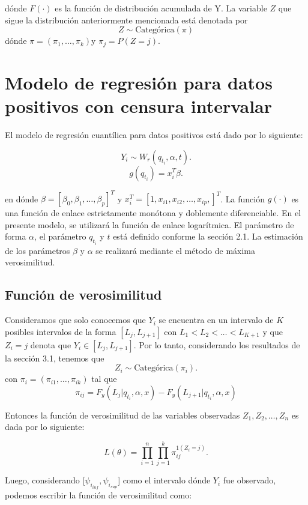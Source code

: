 \noindent dónde $F(\cdot)$ es la función de distribución acumulada de Y. La variable $Z$ que sigue la distribución anteriormente mencionada está denotada por 
$$Z \sim \text{Categórica}(\pi)$$
\noindent dónde $\pi=\left( \pi_{1},\dots,\pi_{k}\right)$y $\pi_{j}=P(Z=j)$.

\section{Modelo de regresión para datos positivos con censura intervalar}

El modelo de regresión cuantílica para datos positivos está dado por lo siguiente:

\[Y_{i} \sim W_{r}\left( q_{t_{i}},\alpha,t \right).\]
\[g\left( q_{t_{i}} \right) = x_{i}^{T}\beta.\]

\noindent en dónde $\beta=\left[ \beta_0,\beta_{1},\dots,\beta_{p} \right]^{T}$ y $x_{i}^{T} =\left[ 1,x_{i1},x_{i2},\dots,x_{ip}, \right]^{T}$. La función $g(\cdot)$ es una función de enlace estrictamente monótona y doblemente diferenciable. En el presente modelo, se utilizará la función de enlace logarítmica. El parámetro de forma $\alpha$, el parámetro $q_{t_{i}}$ y $t$ está definido conforme la sección 2.1. La estimación de los parámetros $\beta$ y $\alpha$ se realizará mediante el método de máxima verosimilitud.

\subsection{Función de verosimilitud}
Consideramos que solo conocemos que $Y_{i}$ se encuentra en un intervalo de $K$ posibles intervalos de la forma $[L_{j},L_{j+1}]$ con $L_1 < L_2 < \dots < L_{K+1}$ y que $Z_{i}=j$ denota que $Y_{i} \in [L_{j},L_{j+1}]$. Por lo tanto, considerando los resultados de la sección 3.1, tenemos que
\[Z_{i} \sim \text{Categórica}(\pi_{i}).\]
\noindent con $\pi_{i}=\left( \pi_{i1},\dots, \pi_{ik} \right)$ tal que
\begin{equation}
\pi_{ij} = F_{y}(L_{j}|q_{t_{i}},\alpha,x) - F_{y}\left( L_{j+1}|q_{t_{i}},\alpha,x \right)
\end{equation}

Entonces la función de verosimilitud de las variables observadas $Z_{1},Z_{2},\dots,Z_{n}$ es dada por lo siguiente:

\[L(\theta)=\prod_{i=1}^{n}\prod_{j=1}^{k} \pi_{ij}^{1\left( Z_{i}=j \right)}.\]

Luego, considerando  [$\psi_{i_{inf}},\psi_{i_{sup}}$] como el intervalo dónde $Y_{i}$ fue observado, podemos escribir la función de verosimilitud como:

